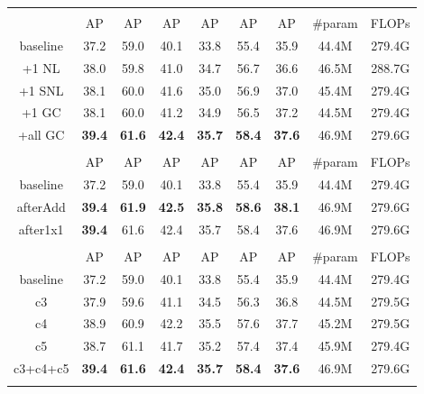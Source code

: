 \documentclass[10pt,twocolumn,letterpaper]{article}
\begin{document}
\begin{table}[]
    \centering
    \footnotesize
    \addtolength{\tabcolsep}{-5.5pt}
\begin{tabular}{c|ccc|ccc|c|c}
\Xhline{1.0pt}
\multicolumn{9}{c}{(a) \textbf{Block design}}                              \\
     & AP & AP & AP&AP&AP&AP &  \#param & FLOPs \\
\hline
    baseline & 37.2   & 59.0 & 40.1 & 33.8 & 55.4 & 35.9 & 44.4M & 279.4G \\
+1 NL & 38.0 & 59.8 & 41.0 & 34.7 & 56.7 & 36.6 & 46.5M & 288.7G \\
+1 SNL & 38.1 & 60.0 & 41.6 & 35.0 & 56.9 & 37.0 & 45.4M & 279.4G \\
+1 GC & 38.1  & 60.0 & 41.2 & 34.9 & 56.5 & 37.2 & 44.5M & 279.4G \\
+all GC  & \textbf{39.4} & \textbf{61.6} & \textbf{42.4} & \textbf{35.7} & \textbf{58.4} & \textbf{37.6} & 46.9M & 279.6G \\
\Xhline{1.0pt}
\multicolumn{9}{c}{(b) \textbf{Positions}}                                     \\
     & AP & AP & AP&AP&AP&AP &  \#param & FLOPs \\
\hline
    baseline & 37.2   & 59.0 & 40.1 & 33.8 & 55.4 & 35.9 & 44.4M & 279.4G \\
afterAdd & \textbf{39.4} & \textbf{61.9} & \textbf{42.5} & \textbf{35.8} & \textbf{58.6} & \textbf{38.1} & 46.9M & 279.6G \\
after1x1 & \textbf{39.4} & 61.6 & 42.4 & 35.7 & 58.4 & 37.6 & 46.9M & 279.6G \\
\Xhline{1.0pt}
\multicolumn{9}{c}{(c) \textbf{Stages}}                                       \\
& AP & AP & AP&AP&AP&AP &  \#param & FLOPs \\
\hline
    baseline & 37.2   & 59.0 & 40.1 & 33.8 & 55.4 & 35.9 & 44.4M & 279.4G \\
c3 & 37.9 & 59.6 & 41.1 & 34.5 & 56.3 & 36.8 & 44.5M & 279.5G \\
c4 & 38.9 & 60.9 & 42.2 & 35.5 & 57.6 & 37.7 & 45.2M & 279.5G \\
c5 & 38.7 & 61.1 & 41.7 & 35.2 & 57.4 & 37.4 & 45.9M & 279.4G \\
c3+c4+c5 & \textbf{39.4} & \textbf{61.6} & \textbf{42.4} & \textbf{35.7} & \textbf{58.4} & \textbf{37.6} & 46.9M & 279.6G \\
\Xhline{1.0pt}
\multicolumn{9}{c}{(d) \textbf{Bottleneck design}}                            \\

\end{tabular}
\end{table}
\end{document}
